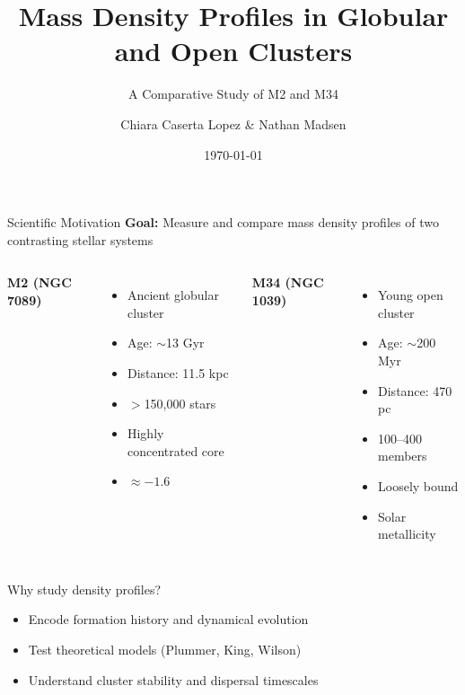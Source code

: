 \documentclass{beamer}
\title[M2 \& M34 Density Profiles]{Mass Density Profiles in Globular and Open Clusters}
\subtitle{A Comparative Study of M2 and M34}
\author{Chiara Caserta Lopez \& Nathan Madsen}
\institute
{
    Physics 134L \\
    UC Santa Barbara
}
\date{\today}
\begin{document}
\begin{frame}
    \titlepage
\end{frame}


\begin{frame}{Scientific Motivation}
    \textbf{Goal:} Measure and compare mass density profiles of two contrasting stellar systems

    \vspace{0.5cm}

    \begin{columns}[c]
        \textbf{M2 (NGC 7089)}
        \begin{itemize}
            \item Ancient globular cluster
            \item Age: $\sim$13 Gyr
            \item Distance: 11.5 kpc
            \item $>$150,000 stars
            \item Highly concentrated core
            \item [Fe/H] $\approx -1.6$
        \end{itemize}

        \textbf{M34 (NGC 1039)}
        \begin{itemize}
            \item Young open cluster
            \item Age: $\sim$200 Myr
            \item Distance: 470 pc
            \item 100--400 members
            \item Loosely bound
            \item Solar metallicity
        \end{itemize}
    \end{columns}

    \vspace{0.5cm}

    \alert{Why study density profiles?}
    \begin{itemize}
        \item Encode formation history and dynamical evolution
        \item Test theoretical models (Plummer, King, Wilson)
        \item Understand cluster stability and dispersal timescales
    \end{itemize}
\end{frame}
\end{document}
